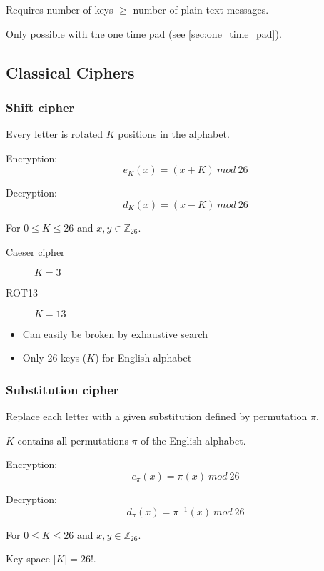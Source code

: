 \documentclass[a4paper]{article}
\begin{document}
Requires number of keys $\geq$ number of plain text messages.

Only possible with the one time pad (see \ref{sec:one_time_pad}).

\subsection{Classical Ciphers}

\subsubsection{Shift cipher}

Every letter is rotated $K$ positions in the alphabet.

Encryption:
\[
  e_{K}(x) = (x + K) \: mod \: 26
\]

Decryption:
\[
  d_{K}(x) = (x - K) \: mod \: 26
\]

For $0 \leq K \leq 26$ and $x, y \in \mathbb{Z}_{26}$.

\begin{description}
  \item[Caeser cipher]
    $K=3$
  \item[ROT13]
    $K=13$
\end{description}


\begin{itemize}
  \item Can easily be broken by exhaustive search
  \item Only 26 keys ($K$) for English alphabet
\end{itemize}

\subsubsection{Substitution cipher}

Replace each letter with a given substitution defined by permutation $\pi$.

$K$ contains all permutations $\pi$ of the English alphabet.

Encryption:
\[
  e_{\pi}(x) = \pi(x) \: mod \: 26
\]

Decryption:
\[
  d_{\pi}(x) = \pi^{-1}(x) \: mod \: 26
\]

For $0 \leq K \leq 26$ and $x, y \in \mathbb{Z}_{26}$.

Key space $|K| = 26!$.

\end{document}
